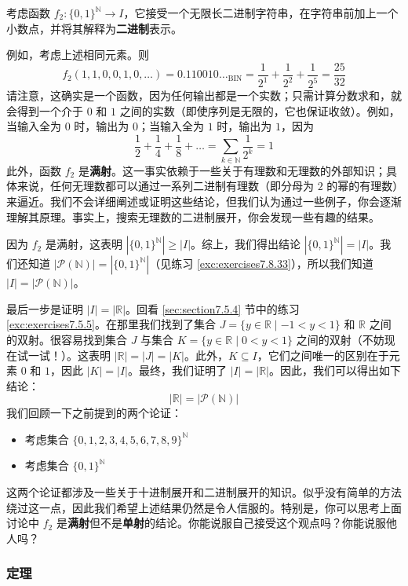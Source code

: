 \begin{example}
    考虑函数 $f_2 : \{0, 1\}^{\mathbb{N}} \to I$，它接受一个无限长二进制字符串，在字符串前加上一个小数点，并将其解释为\textbf{二进制}表示。

    例如，考虑上述相同元素。则
    \[f_2(1, 1, 0, 0, 1, 0, \dots) = 0.110010 \dots _\text{BIN} = \frac{1}{2^1}+\frac{1}{2^2}+\frac{1}{2^5} = \frac{25}{32}\]
    请注意，这确实是一个函数，因为任何输出都是一个实数；只需计算分数求和，就会得到一个介于 $0$ 和 $1$ 之间的实数（即使序列是无限的，它也保证收敛）。例如，当输入全为 $0$ 时，输出为 $0$；当输入全为 $1$ 时，输出为 $1$，因为
    \[\frac{1}{2}+\frac{1}{4}+\frac{1}{8}+\dots = \sum_{k \in \mathbb{N}} \frac{1}{2^k} = 1\]
    此外，函数 $f_2$ 是\textbf{满射}。这一事实依赖于一些关于有理数和无理数的外部知识；具体来说，任何无理数都可以通过一系列二进制有理数（即分母为 $2$ 的幂的有理数）来逼近。我们不会详细阐述或证明这些结论，但我们认为通过一些例子，你会逐渐理解其原理。事实上，搜索无理数的二进制展开，你会发现一些有趣的结果。

    因为 $f_2$ 是满射，这表明 $|\{0,1\}^{\mathbb{N}}| \ge |I|$。综上，我们得出结论 $|\{0,1\}^{\mathbb{N}}| = |I|$。我们还知道 $|\mathcal{P}(\mathbb{N})| = |\{0, 1\}^{\mathbb{N}}|$（见练习 \ref{exc:exercises7.8.33}），所以我们知道 $|I| = |\mathcal{P}(\mathbb{N})|$。

    最后一步是证明 $|I| = |\mathbb{R}|$。回看 \ref{sec:section7.5.4} 节中的练习 \ref{exc:exercises7.5.5}。在那里我们找到了集合 $J = \{y \in \mathbb{R} \mid -1 < y < 1\}$ 和 $\mathbb{R}$ 之间的双射。很容易找到集合 $J$ 与集合 $K = \{y \in \mathbb{R} \mid 0 < y < 1\}$ 之间的双射（不妨现在试一试！）。这表明 $|\mathbb{R}| = |J| = |K|$。此外，$K \subseteq I$，它们之间唯一的区别在于元素 $0$ 和 $1$，因此 $|K| = |I|$。最终，我们证明了 $|I| = |\mathbb{R}|$。因此，我们可以得出如下结论：
    \[|\mathbb{R}| = |\mathcal{P}(\mathbb{N})|\]
    我们回顾一下之前提到的两个论证：
    \begin{itemize}
        \item 考虑集合 $\{0, 1, 2, 3, 4, 5, 6, 7, 8, 9\}^\mathbb{N}$
        \item 考虑集合 $\{0, 1\}^\mathbb{N}$
    \end{itemize}
    这两个论证都涉及一些关于十进制展开和二进制展开的知识。似乎没有简单的方法绕过这一点，因此我们希望上述结果仍然是令人信服的。特别是，你可以思考上面讨论中 $f_2$ 是\textbf{满射}但不是\textbf{单射}的结论。你能说服自己接受这个观点吗？你能说服他人吗？
\end{example}

\subsubsection*{定理}

